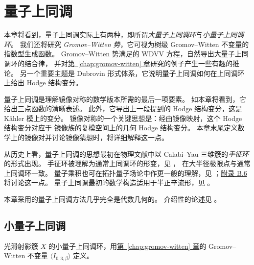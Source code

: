 \chapter{量子上同调}\label{chap:quantum-cohomology}
本章将看到，量子上同调实际上有两种，即所谓\emph{大量子上同调环}与\emph{小量子上同调环}。
我们还将研究 \emph{Gromov--Witten 势}，它可视为树级 Gromov--Witten 不变量的指数型生成函数。
Gromov--Witten 势满足的 WDVV 方程，自然导出大量子上同调环的结合律，
并对\hyperref[chap:gromov-witten]{第~\ref*{chap:gromov-witten} 章}研究的例子产生一些有趣的推论。
另一个重要主题是 Dubrovin 形式体系，它说明量子上同调如何在上同调环上给出 Hodge 结构变分。

量子上同调是理解镜像对称的数学版本所需的最后一项要素。
如本章将看到，它给出三点函数的清晰表述。
此外，它导出上一段提到的 Hodge 结构变分，这是 Kähler 模上的变分。
镜像对称的一个关键思想是：经由镜像映射，这个 Hodge 结构变分对应于
镜像族的复模空间上的几何 Hodge 结构变分。
本章末尾定义数学上的镜像对并讨论镜像猜想时，将详细解释这一点。

从历史上看，量子上同调的思想最初在物理文献中以 Calabi--Yau 三维簇的\emph{手征环}的形式出现。
手征环被理解为通常上同调环的形变，见 ，
在大半径极限点与通常上同调环一致。
量子乘积也可在拓扑量子场论中作更一般的理解，见 ；\hyperref[sec:topological-qft]{附录 B.6} 将讨论这一点。
量子上同调最初的数学构造适用于半正辛流形，见 。

本章采用的量子上同调方法几乎完全是代数几何的。
介绍性的论述见 。

\section{小量子上同调}\label{sec:small-quantum-cohomology}
光滑射影簇 $X$ 的小量子上同调环，用\hyperref[chap:gromov-witten]{第~\ref*{chap:gromov-witten} 章}的 Gromov--Witten 不变量 $\langle I_{0,3,\beta}\rangle$ 定义。

